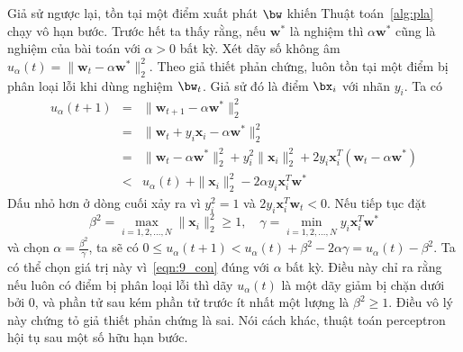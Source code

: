 Giả sử ngược lại, tồn tại một điểm xuất phát $\bw$ khiến Thuật
toán~\ref{alg:pla} chạy vô hạn bước. Trước hết ta thấy rằng, nếu $\mathbf{w}^*$ là nghiệm thì $\alpha\mathbf{w}^*$ cũng là nghiệm của
bài toán với $\alpha > 0$ bất kỳ. Xét dãy số không âm $ u_{\alpha}(t) = \|\mathbf{w}_{t} -
\alpha\mathbf{w}^*\|_2^2$. Theo giả thiết phản chứng, luôn tồn tại một điểm bị phân
loại lỗi khi dùng nghiệm $\bw_t$. Giả sử đó là điểm $\bx_i$ với nhãn $y_i$. Ta
có
\begin{eqnarray} 
\nonumber
    u_{\alpha}(t+1) &=& \|\mathbf{w}_{t+1} - \alpha \mathbf{w}^*\|_2^2 \\\ 
\nonumber
    &=& \|\mathbf{w}_{t} + y_i\mathbf{x}_i - \alpha\mathbf{w}^*\|_2^2 \\\ 
\nonumber
    &=& \|\mathbf{w}_{t} -\alpha\mathbf{w}^*\|_2^2 + y_i^2\|\mathbf{x}_i\|_2^2 + 2y_i\mathbf{x}_i^T(\mathbf{w}_t - \alpha\mathbf{w}^*) \\\ 
    \label{eqn:9_con}
    &<& u_{\alpha}(t) \ + \|\mathbf{x}_i\|_2^2 - 2\alpha y_i\mathbf{x}_i^T \mathbf{w}^* 
\end{eqnarray} 
Dấu nhỏ hơn ở dòng cuối xảy ra vì $y_i^2 = 1$ và $2y_i\mathbf{x}_i^T\mathbf{w}_{t} <
0$. Nếu tiếp tục đặt
\begin{equation*} 
\beta^2 = \max_{i=1, 2, \dots, N}\|\mathbf{x}_i\|_2^2 \geq 1, \quad
\gamma = \min_{i=1, 2, \dots, N} y_i\mathbf{x}_i^T\mathbf{w}^*
\end{equation*} 
và chọn $\alpha = \frac{\beta^2}{\gamma}$, ta sẽ có
\begin{math} 
0 \leq u_{\alpha}(t+1) < u_{\alpha}(t) + \beta^2 - 2\alpha\gamma = u_{\alpha}(t) - \beta^2. 
\end{math} Ta có thể chọn giá trị này vì~\eqref{eqn:9_con} đúng với $\alpha$ bất kỳ. Điều này chỉ ra rằng nếu luôn có điểm bị phân loại lỗi thì dãy $u_{\alpha}(t)$ là một dãy giảm bị chặn dưới bởi 0, và phần tử sau kém phần tử trước ít nhất một lượng là $\beta^2\geq 1$. Điều vô lý này chứng tỏ giả thiết phản chứng là sai. Nói cách khác, thuật toán perceptron hội tụ sau một số hữu hạn bước.  
 





 
